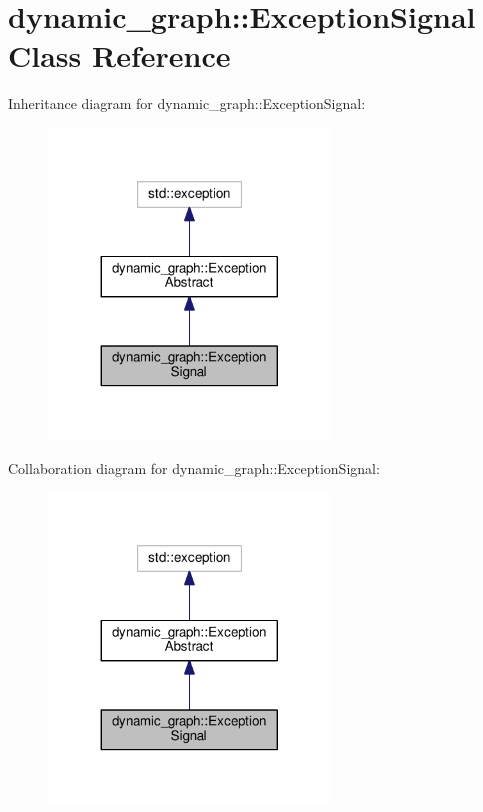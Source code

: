 \hypertarget{classdynamic__graph_1_1ExceptionSignal}{}\section{dynamic\+\_\+graph\+:\+:Exception\+Signal Class Reference}
\label{classdynamic__graph_1_1ExceptionSignal}


Inheritance diagram for dynamic\+\_\+graph\+:\+:Exception\+Signal\+:\nopagebreak
\begin{figure}[H]
\begin{center}
\leavevmode
\includegraphics[width=212pt]{classdynamic__graph_1_1ExceptionSignal__inherit__graph}
\end{center}
\end{figure}


Collaboration diagram for dynamic\+\_\+graph\+:\+:Exception\+Signal\+:\nopagebreak
\begin{figure}[H]
\begin{center}
\leavevmode
\includegraphics[width=212pt]{classdynamic__graph_1_1ExceptionSignal__coll__graph}
\end{center}
\end{figure}
